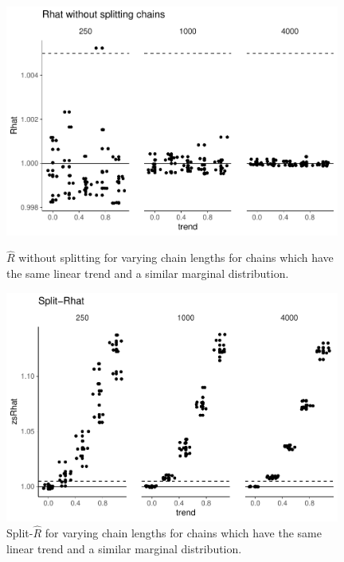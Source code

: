 \documentclass[american,]{article}
\theoremstyle{definition}
\begin{document}
\begin{figure}[tp]
  \centering
  \begin{minipage}{0.48\textwidth}
  \includegraphics[width=0.98\textwidth]{graphics/rhat-same-trend-1.pdf}
  \caption{\(\widehat{R}\) without splitting for varying chain lengths
    for chains which have the same linear trend and a 
    similar marginal distribution.}
  \label{fig:rhat-same-trend-1}
\end{minipage}
\hfill
  \begin{minipage}{0.48\textwidth}
  \includegraphics[width=0.98\textwidth]{graphics/zsrhat-same-trend-1.pdf}
  \caption{Split-\(\widehat{R}\) for varying chain lengths
    for chains which have the same linear trend and a similar marginal
    distribution.}
  \label{fig:zsrhat-same-trend-1}
\end{minipage}
\end{figure}
\end{document}
